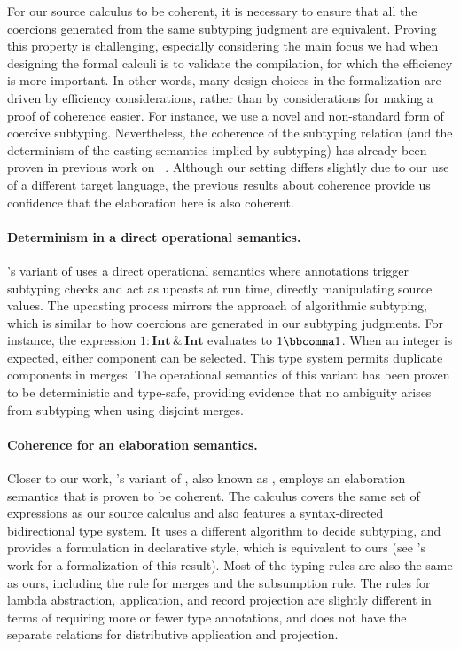 For our source calculus to be coherent, it is necessary to ensure that all the
coercions generated from the same subtyping judgment are equivalent. Proving
this property is challenging, especially considering the main focus we had when
designing the formal calculi is to validate the compilation, for which the
efficiency is more important. In other words, many design choices in the
formalization are driven by efficiency considerations, rather than by
considerations for making a proof of coherence easier. For instance, we use a
novel and non-standard form of coercive subtyping. Nevertheless, the coherence
of the subtyping relation (and the determinism of the casting semantics implied
by subtyping) has already been proven in previous work on
\lambdaiplus~\citep{bi2018essence,huang2021taming}. Although our setting differs
slightly due to our use of a different target language, the previous results
about coherence provide us confidence that the elaboration here is also
coherent.

\paragraph{Determinism in a direct operational semantics.}
\citeauthor{huang2021taming}'s variant of \lambdaiplus uses a direct operational
semantics where annotations trigger subtyping checks and act as upcasts at run
time, directly manipulating source values. The upcasting process mirrors the
approach of algorithmic subtyping, which is similar to how coercions are
generated in our subtyping judgments. For instance, the expression
$1  :   \mathbf{Int}   \, {\&} \,   \mathbf{Int} $ evaluates to $1  \bbcomma  1$. When an integer is expected, either
component can be selected. This type system permits duplicate components in
merges. The operational semantics of this variant has been proven to be
deterministic and type-safe, providing evidence that no ambiguity arises from
subtyping when using disjoint merges.

\paragraph{Coherence for an elaboration semantics.}
Closer to our work, \citeauthor{bi2018essence}'s variant of \lambdaiplus, also
known as \necolus, employs an elaboration semantics that is proven to be
coherent. The \necolus calculus covers the same set of expressions as our source
calculus and also features a syntax-directed bidirectional type system. It uses
a different algorithm to decide subtyping, and provides a formulation in
declarative style, which is equivalent to ours (see
\citeauthor{huang2021taming}'s work for a formalization of this result).  Most
of the typing rules are also the same as ours, including the rule for merges and
the subsumption rule.  The rules for lambda abstraction, application, and record
projection are slightly different in terms of requiring more or fewer type
annotations, and \necolus does not have the separate relations for distributive
application and projection.

